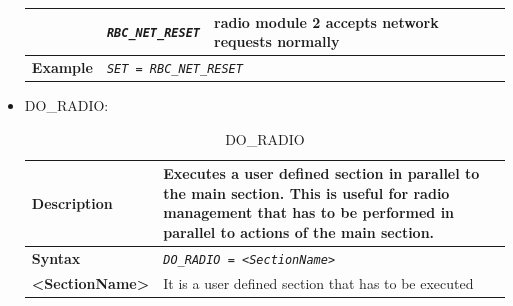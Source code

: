 \begin{itemize}
\begin{longtable}{|l|l|l|}
				\hline

				&	\begin{minipage}[t]{0.40\linewidth} \emph{\texttt{RBC\_NET\_RESET}} \end{minipage}
				&	\begin{minipage}[t]{0.38\linewidth} radio module 2 accepts network requests normally \end{minipage}\\

				\hline

					\begin{minipage}[t]{0.22\linewidth} \textbf{Example} \end{minipage}
				&	\multicolumn{2}{l|}{ \begin{minipage}[t]{0.78\linewidth} \emph{\texttt{SET = RBC\_NET\_RESET}} \end{minipage} } \\

				\hline \hline

			\end{longtable}

		\item DO\_RADIO:

			\begin{longtable}{|l|l|}
				\caption{DO\_RADIO}\\
				\hline

					\begin{minipage}[t]{0.22\linewidth} \textbf{Description} \end{minipage}
				&	\begin{minipage}[t]{0.78\linewidth} Executes a user defined section in parallel to the main section. This is useful for radio management that has to be performed in parallel to actions of the main section. \end{minipage} \\

				\hline

					\begin{minipage}[t]{0.22\linewidth} \textbf{Syntax}	\end{minipage}
				&	\begin{minipage}[t]{0.78\linewidth }\emph{\texttt{DO\_RADIO = <SectionName>}} \end{minipage} \\

				\hline

					\begin{minipage}[t]{0.22\linewidth} \textbf{<SectionName>} \end{minipage}
				&	\begin{minipage}[t]{0.78\linewidth} It is a user defined section that has to be executed \end{minipage} \\


\end{longtable}
\end{itemize}
